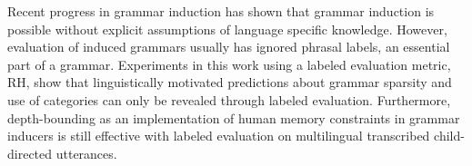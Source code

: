 Recent progress in grammar induction has shown that grammar induction is possible without explicit assumptions of language specific knowledge. However, evaluation of induced grammars usually has ignored phrasal labels, an essential part of a grammar. Experiments in this work using a labeled evaluation metric, RH, show that linguistically motivated predictions about grammar sparsity and use of categories can only be revealed through labeled evaluation. Furthermore, depth-bounding as an implementation of human memory constraints in grammar inducers is still effective with labeled evaluation on multilingual transcribed child-directed utterances.
